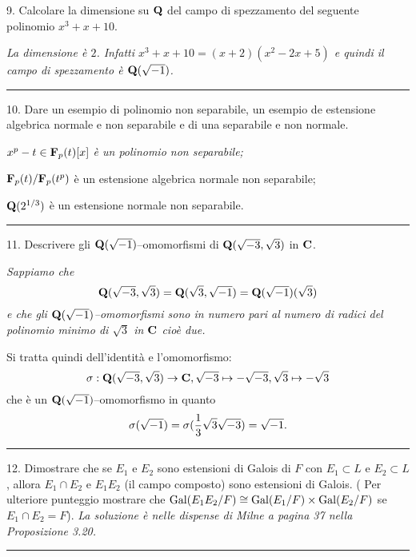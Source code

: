 \item{9.} Calcolare la dimensione su ${\bf Q}$ del campo di
spezzamento del seguente polinomio $x^3+x+10$.\medskip

{\it La dimensione \`{e} $2$. Infatti $x^3+x+10=(x+2)(x^2-2x+5)$ e
quindi il campo di spezzamento \`{e} ${\bf Q}(\sqrt{-1})$.}\medskip\hrule\medskip

\item{10.} Dare un esempio di polinomio non separabile, un esempio
de estensione algebrica normale e non separabile e di una
separabile e non normale.\medskip

{\it \itemitem{-} $x^p-t\in{\bf F}_p(t)[x]$ \`{e} un polinomio non
separabile;\smallskip

 \itemitem{-} ${\bf F}_p(t)/{\bf F}_p(t^p)$ \`{e} un
estensione algebrica normale non separabile;\smallskip

 \itemitem{-}
${\bf Q}(2^{1/3})$ \`{e} un estensione normale non separabile.
}\medskip\hrule\medskip

 \item{11.} Descrivere gli ${\bf Q}(\sqrt{-1})$--omomorfismi di
${\bf Q}(\sqrt{-3},\sqrt{3})$ in ${\bf C}$.\medskip

{\it Sappiamo che
$${\bf Q}(\sqrt{-3},\sqrt{3})={\bf Q}(\sqrt{3},\sqrt{-1})=
{\bf Q}(\sqrt{-1})(\sqrt{3})$$ e che gli ${\bf
Q}(\sqrt{-1})$--omomorfismi sono in numero pari al numero di
radici del polinomio minimo di $\sqrt{3}$ in ${\bf C}$ cio\`{e}
due.

Si tratta quindi dell'identit\`{a} e l'omomorfismo: $$\sigma:{\bf
Q}(\sqrt{-3},\sqrt{3})\rightarrow {\bf C}, \sqrt{-3}\mapsto
-\sqrt{-3}, \sqrt{3}\mapsto -\sqrt{3}$$ che \`{e} un ${\bf
Q}(\sqrt{-1})$--omomorfismo in quanto
$$\sigma(\sqrt{-1})=\sigma({1\over3}\sqrt{3}\sqrt{-3})=\sqrt{-1}.$$
 }\hrule\medskip

\item{12.} Dimostrare che se $E_1$ e $E_2$ sono estensioni di
Galois di $F$ con $E_1\subset L$ e $E_2\subset L$, allora $E_1\cap
E_2$ e  $E_1E_2$ (il campo composto) sono estensioni di Galois. (
Per ulteriore punteggio mostrare che ${\rm Gal}(E_1E_2/F)\cong
{\rm Gal}(E_1/F)\times {\rm Gal}(E_2/F)$ se $E_1\cap E_2 = F$).
\medskip
{\it La soluzione \`{e} nelle dispense di Milne a pagina 37 nella
Proposizione 3.20.}

\medskip
\hrule

 \bye
